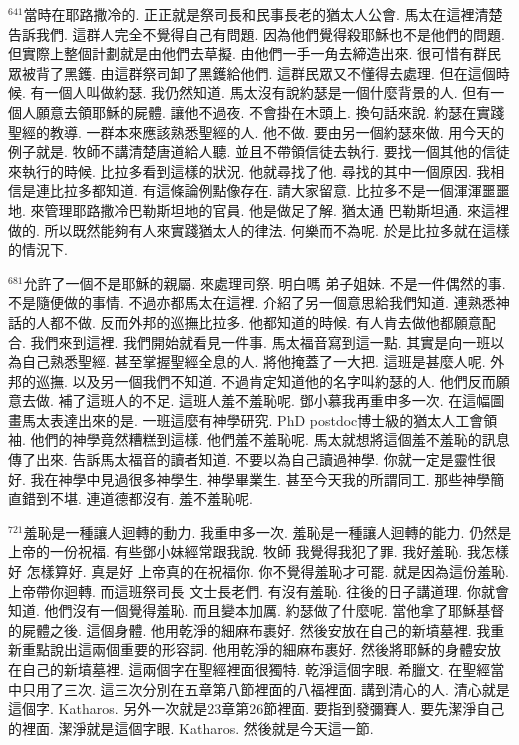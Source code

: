 \documentclass{book}
\begin{document}
$^{641}$當時在耶路撒冷的.
正正就是祭司長和民事長老的猶太人公會.
馬太在這裡清楚告訴我們.
這群人完全不覺得自己有問題.
因為他們覺得殺耶穌也不是他們的問題.
但實際上整個計劃就是由他們去草擬.
由他們一手一角去締造出來.
很可惜有群民眾被背了黑鑊.
由這群祭司卸了黑鑊給他們.
這群民眾又不懂得去處理.
但在這個時候.
有一個人叫做約瑟.
我仍然知道.
馬太沒有說約瑟是一個什麼背景的人.
但有一個人願意去領耶穌的屍體.
讓他不過夜.
不會掛在木頭上.
換句話來說.
約瑟在實踐聖經的教導.
一群本來應該熟悉聖經的人.
他不做.
要由另一個約瑟來做.
用今天的例子就是.
牧師不講清楚唐道給人聽.
並且不帶領信徒去執行.
要找一個其他的信徒來執行的時候.
比拉多看到這樣的狀況.
他就尋找了他.
尋找的其中一個原因.
我相信是連比拉多都知道.
有這條論例點像存在.
請大家留意.
比拉多不是一個渾渾噩噩地.
來管理耶路撒冷巴勒斯坦地的官員.
他是做足了解.
猶太通 巴勒斯坦通.
來這裡做的.
所以既然能夠有人來實踐猶太人的律法.
何樂而不為呢.
於是比拉多就在這樣的情況下.

$^{681}$允許了一個不是耶穌的親屬.
來處理司祭.
明白嗎 弟子姐妹.
不是一件偶然的事.
不是隨便做的事情.
不過亦都馬太在這裡.
介紹了另一個意思給我們知道.
連熟悉神話的人都不做.
反而外邦的巡撫比拉多.
他都知道的時候.
有人肯去做他都願意配合.
我們來到這裡.
我們開始就看見一件事.
馬太福音寫到這一點.
其實是向一班以為自己熟悉聖經.
甚至掌握聖經全息的人.
將他掩蓋了一大把.
這班是甚麼人呢.
外邦的巡撫.
以及另一個我們不知道.
不過肯定知道他的名字叫約瑟的人.
他們反而願意去做.
補了這班人的不足.
這班人羞不羞恥呢.
鄧小慕我再重申多一次.
在這幅圖畫馬太表達出來的是.
一班這麼有神學研究.
PhD postdoc博士級的猶太人工會領袖.
他們的神學竟然糟糕到這樣.
他們羞不羞恥呢.
馬太就想將這個羞不羞恥的訊息傳了出來.
告訴馬太福音的讀者知道.
不要以為自己讀過神學.
你就一定是靈性很好.
我在神學中見過很多神學生.
神學畢業生.
甚至今天我的所謂同工.
那些神學簡直錯到不堪.
連道德都沒有.
羞不羞恥呢.

$^{721}$羞恥是一種讓人迴轉的動力.
我重申多一次.
羞恥是一種讓人迴轉的能力.
仍然是上帝的一份祝福.
有些鄧小妹經常跟我說.
牧師 我覺得我犯了罪.
我好羞恥.
我怎樣好 怎樣算好.
真是好 上帝真的在祝福你.
你不覺得羞恥才可罷.
就是因為這份羞恥.
上帝帶你迴轉.
而這班祭司長 文士長老們.
有沒有羞恥.
往後的日子講道理.
你就會知道.
他們沒有一個覺得羞恥.
而且變本加厲.
約瑟做了什麼呢.
當他拿了耶穌基督的屍體之後.
這個身體.
他用乾淨的細麻布裹好.
然後安放在自己的新墳墓裡.
我重新重點說出這兩個重要的形容詞.
他用乾淨的細麻布裹好.
然後將耶穌的身體安放在自己的新墳墓裡.
這兩個字在聖經裡面很獨特.
乾淨這個字眼.
希臘文.
在聖經當中只用了三次.
這三次分別在五章第八節裡面的八福裡面.
講到清心的人.
清心就是這個字.
Katharos.
另外一次就是23章第26節裡面.
要指到發彌賽人.
要先潔淨自己的裡面.
潔淨就是這個字眼.
Katharos.
然後就是今天這一節.
\end{document}
